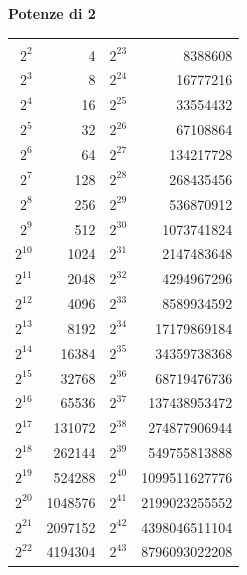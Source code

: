 \begin{center}
\textbf{Potenze di 2}\\[6pt]
\small
\renewcommand{\arraystretch}{1.05}
\begin{tabular}{rr@{\qquad\qquad}rr}
\toprule
\multicolumn{2}{c}{} & \multicolumn{2}{c}{} \\[-12pt]
$2^{2}$ & 4 & $2^{23}$ & 8388608 \\
$2^{3}$ & 8 & $2^{24}$ & 16777216 \\
$2^{4}$ & 16 & $2^{25}$ & 33554432 \\
$2^{5}$ & 32 & $2^{26}$ & 67108864 \\
$2^{6}$ & 64 & $2^{27}$ & 134217728 \\
$2^{7}$ & 128 & $2^{28}$ & 268435456 \\
$2^{8}$ & 256 & $2^{29}$ & 536870912 \\
$2^{9}$ & 512 & $2^{30}$ & 1073741824 \\
$2^{10}$ & 1024 & $2^{31}$ & 2147483648 \\
$2^{11}$ & 2048 & $2^{32}$ & 4294967296 \\
$2^{12}$ & 4096 & $2^{33}$ & 8589934592 \\
$2^{13}$ & 8192 & $2^{34}$ & 17179869184 \\
$2^{14}$ & 16384 & $2^{35}$ & 34359738368 \\
$2^{15}$ & 32768 & $2^{36}$ & 68719476736 \\
$2^{16}$ & 65536 & $2^{37}$ & 137438953472 \\
$2^{17}$ & 131072 & $2^{38}$ & 274877906944 \\
$2^{18}$ & 262144 & $2^{39}$ & 549755813888 \\
$2^{19}$ & 524288 & $2^{40}$ & 1099511627776 \\
$2^{20}$ & 1048576 & $2^{41}$ & 2199023255552 \\
$2^{21}$ & 2097152 & $2^{42}$ & 4398046511104 \\
$2^{22}$ & 4194304 & $2^{43}$ & 8796093022208 \\
\bottomrule
\end{tabular}
\end{center}

